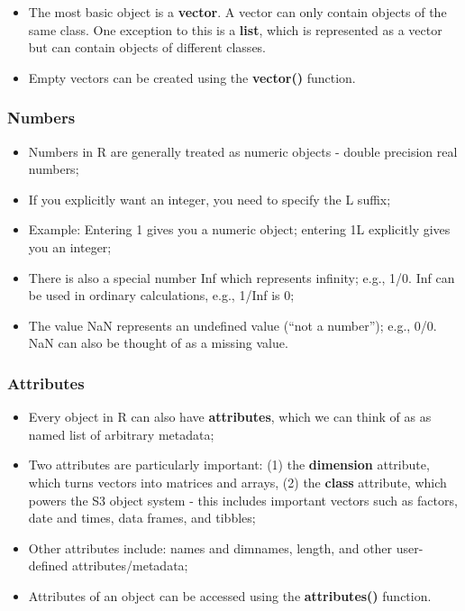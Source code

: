 \documentclass[10pt,a4paper,twoside]{article}\usepackage[]{graphicx}\usepackage[]{xcolor}
\begin{document}
\begin{itemize}
  \item The most basic object is a \textbf{vector}. A vector can only contain objects of the same class. One exception to this is a \textbf{list}, which is represented as a vector but can contain objects of different classes.
\end{itemize}

\begin{itemize}
  \item Empty vectors can be created using the \textbf{vector()} function.
\end{itemize}

\subsubsection{Numbers}

\begin{itemize}
  \item Numbers in R are generally treated as numeric objects - double precision real numbers;
  \item If you explicitly want an integer, you need to specify the L suffix;
  \item Example: Entering 1 gives you a numeric object; entering 1L explicitly gives you an integer;
  \item There is also a special number Inf which represents infinity; e.g., 1/0. Inf can be used in ordinary calculations, e.g., 1/Inf is 0;
  \item The value NaN represents an undefined value (``not a number''); e.g., 0/0. NaN can also be thought of as a missing value.
\end{itemize}

\subsubsection{Attributes}

\begin{itemize}
  \item Every object in R can also have \textbf{attributes}, which we can think of as as named list of arbitrary metadata;
  \item Two attributes are particularly important: (1) the \textbf{dimension} attribute, which turns vectors into matrices and arrays, (2) the \textbf{class} attribute, which powers the S3 object system - this includes important vectors such as factors, date and times, data frames, and tibbles;
  \item Other attributes include: names and dimnames, length, and other user-defined attributes/metadata;
  \item Attributes of an object can be accessed using the \textbf{attributes()} function.
\end{itemize}
\end{document}
